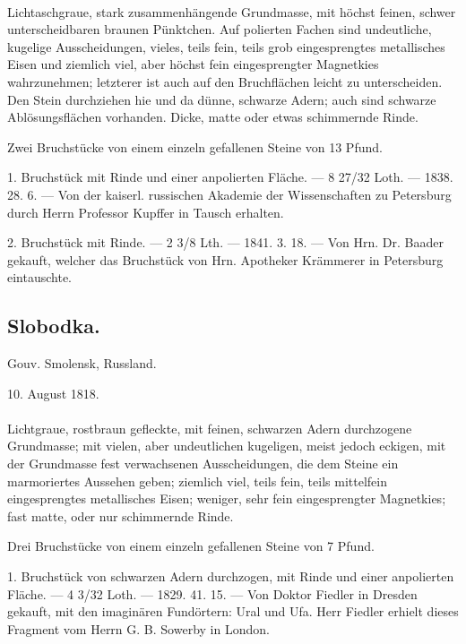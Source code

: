 \documentclass[a4paper, 11pt, oneside, polutonikogreek, german]{article}
\begin{document}
\paragraph{}
Lichtaschgraue, stark zusammenhängende Grundmasse, mit höchst feinen, schwer unterscheidbaren braunen Pünktchen. Auf polierten Fachen sind undeutliche, kugelige Ausscheidungen, vieles, teils fein, teils grob eingesprengtes metallisches Eisen und ziemlich viel, aber höchst fein eingesprengter Magnetkies wahrzunehmen; letzterer ist auch auf den Bruchflächen leicht zu unterscheiden. Den Stein durchziehen hie und da dünne, schwarze Adern; auch sind schwarze Ablösungsflächen vorhanden. Dicke, matte oder etwas schimmernde Rinde.

Zwei Bruchstücke von einem einzeln gefallenen Steine von 13 Pfund.

1. Bruchstück mit Rinde und einer anpolierten Fläche. — 8 27/32 Loth. — 1838. 28. 6. — Von der kaiserl. russischen Akademie der Wissenschaften zu Petersburg durch Herrn Professor Kupffer in Tausch erhalten.

2. Bruchstück mit Rinde. — 2 3/8 Lth. — 1841. 3. 18. — Von Hrn. Dr. Baader gekauft, welcher das Bruchstück von Hrn. Apotheker Krämmerer in Petersburg eintauschte.
\subsection{Slobodka.}
\begin{center}
\small
Gouv. Smolensk, Russland.

10. August 1818.
\end{center}
\paragraph{}
Lichtgraue, rostbraun gefleckte, mit feinen, schwarzen Adern durchzogene Grundmasse; mit vielen, aber undeutlichen kugeligen, meist jedoch eckigen, mit der Grundmasse fest verwachsenen Ausscheidungen, die dem Steine ein marmoriertes Aussehen geben; ziemlich viel, teils fein, teils mittelfein eingesprengtes metallisches Eisen; weniger, sehr fein eingesprengter Magnetkies; fast matte, oder nur schimmernde Rinde.

Drei Bruchstücke von einem einzeln gefallenen Steine von 7 Pfund.

1. Bruchstück von schwarzen Adern durchzogen, mit Rinde und einer anpolierten Fläche. — 4 3/32 Loth. — 1829. 41. 15. — Von Doktor Fiedler in Dresden gekauft, mit den imaginären Fundörtern: Ural und Ufa. Herr Fiedler erhielt dieses Fragment vom Herrn G. B. Sowerby in London.
\end{document}
